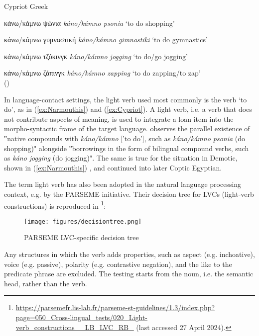 \documentclass[output=paper,colorlinks,citecolor=brown]{langscibook}
\begin{document}
\ex\label{ex:Cypriot}
Cypriot Greek 


\ea κάνω/κάμνω ψώνια \textit{káno/kámno psonia} ‘to do shopping’


\ex κάνω/κάμνω γυμναστική \textit{káno/kámno gimnastiki} ‘to do gymnastics'


\ex κάνω/κάμνω τζόκινγκ \textit{káno/kámno jogging} ‘to do/go jogging’


\ex κάνω/κάμνω ζάπινγκ \textit{káno/kámno zapping} ‘to do zapping/to zap’ \\
\hspace*{\fill}(\citet[73]{fotiouCodeChoiceEnglishCypriot2010})
\z
\z

In language-contact settings, the light verb used most commonly is the verb ‘to do’, as in (\ref{ex:Narmouthis}) and (\ref{ex:Cypriot}). A light verb, i.e. a verb that does not contribute aspects of meaning, is used to integrate a loan item into the morpho-syntactic frame of the target language.
\citet[73]{fotiouCodeChoiceEnglishCypriot2010} observes the parallel existence of ‟native compounds with 
\textit{káno/kámno} ['to do'], 
such as \textit{káno/kámno psonia} (do shopping)" alongside 
‟borrowings in the form of bilingual compound verbs, such as \textit{káno jogging} (do jogging)".
The same is true for the situation in Demotic, shown in (\ref{ex:Narmouthis}) \citep{funkDifferentialLoanCoptic2017, grossmanDialectalVariationLanguage2017, egediRemarksLoanVerb2017}, and  continued into later Coptic Egyptian.   


The term light verb has also been adopted in the natural language processing context, e.g. by the PARSEME initiative. Their decision tree for LVCs (light-verb constructions) is reproduced in \footnote{\url{https://parsemefr.lis-lab.fr/parseme-st-guidelines/1.3/index.php?page=050_Cross-lingual_tests/020_Light-verb_constructions__LB_LVC_RB_} (last accessed 27 April 2024).}:


\begin{figure}
\caption{PARSEME LVC-specific decision tree}
\label{fig:LVSPAR}
\texttt{[image: figures/decisiontree.png]}
\end{figure}


Any structures in which the verb adds properties, such as aspect (e.g. inchoative), voice (e.g. passive), polarity (e.g. contrastive negation), and the like to the predicate phrase are excluded. The testing starts from the noun, i.e. the semantic head, rather than the verb.
\end{document}

